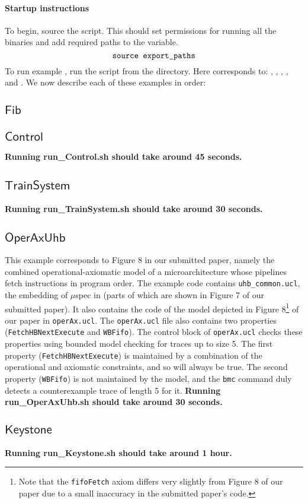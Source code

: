 \documentclass[runningheads]{llncs}
\begin{document}
\paragraph{Startup instructions}
To begin, source the  script. 
This should set permissions for running all the binaries and add required paths to the  variable.
\begin{equation*}
    \texttt{source export\_paths}
\end{equation*}
To run example , 
run the script  
from the  directory.
Here  corresponds to:
, ,
, , and .
We now describe each of these examples in order:

\newcommand{\excommand}[1]{$\mathsf{#1}$}

\subsection{\excommand{Fib}}


\subsection{\excommand{Control}}

\textbf{Running run\_Control.sh should take around 45 seconds.}

\subsection{\excommand{TrainSystem}}

\textbf{Running run\_TrainSystem.sh should take around 30 seconds.}

\subsection{\excommand{OperAxUhb}}
This example corresponds to Figure 8 in our submitted paper, namely the combined operational-axiomatic model of a microarchitecture whose pipelines fetch instructions in program order.
The example code contains \texttt{uhb\_common.ucl}, the embedding of $\mu$spec in \uclid (parts of which are shown in Figure 7 of our submitted paper).
It also contains the code of the model depicted in Figure 8\footnote{Note that the \texttt{fifoFetch} axiom differs very slightly from Figure 8 of our paper due to a small inaccuracy in the submitted paper's code.} of our paper in \texttt{operAx.ucl}.
The \texttt{operAx.ucl} file also contains two properties (\texttt{FetchHBNextExecute} and \texttt{WBFifo}). The control block of \texttt{operAx.ucl} checks these properties using bounded model checking for traces up to size 5.
The first property (\texttt{FetchHBNextExecute}) is maintained by a combination of the operational and axiomatic constraints, and so will always be true.
The second property (\texttt{WBFifo}) is not maintained by the model, and the \texttt{bmc} command duly detects a counterexample trace of length 5 for it.
\textbf{Running run\_OperAxUhb.sh should take around 30 seconds.}

\subsection{\excommand{Keystone}}

\textbf{Running run\_Keystone.sh should take around 1 hour.}
\end{document}
